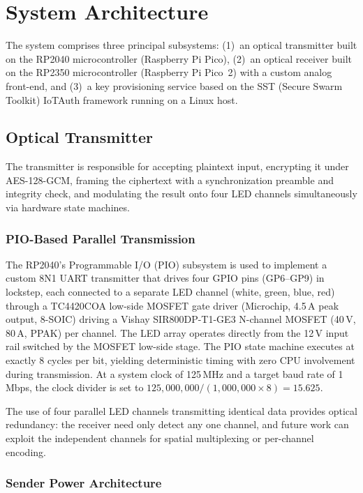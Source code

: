 \documentclass[conference]{IEEEtran}
\begin{document}
\section{System Architecture}

The system comprises three principal subsystems: (1)~an optical transmitter built on the RP2040 microcontroller (Raspberry Pi Pico), (2)~an optical receiver built on the RP2350 microcontroller (Raspberry Pi Pico~2) with a custom analog front-end, and (3)~a key provisioning service based on the SST (Secure Swarm Toolkit) IoTAuth framework running on a Linux host.

\subsection{Optical Transmitter}

The transmitter is responsible for accepting plaintext input, encrypting it under AES-128-GCM, framing the ciphertext with a synchronization preamble and integrity check, and modulating the result onto four LED channels simultaneously via hardware state machines.

\subsubsection{PIO-Based Parallel Transmission}

The RP2040's Programmable I/O (PIO) subsystem is used to implement a custom 8N1 UART transmitter that drives four GPIO pins (GP6--GP9) in lockstep, each connected to a separate LED channel (white, green, blue, red) through a TC4420COA low-side MOSFET gate driver (Microchip, 4.5\,A peak output, 8-SOIC) driving a Vishay SIR800DP-T1-GE3 N-channel MOSFET (40\,V, 80\,A, PPAK) per channel. The LED array operates directly from the 12\,V input rail switched by the MOSFET low-side stage. The PIO state machine executes at exactly 8 cycles per bit, yielding deterministic timing with zero CPU involvement during transmission. At a system clock of 125\,MHz and a target baud rate of 1\,Mbps, the clock divider is set to $125{,}000{,}000 / (1{,}000{,}000 \times 8) = 15.625$.

The use of four parallel LED channels transmitting identical data provides optical redundancy: the receiver need only detect any one channel, and future work can exploit the independent channels for spatial multiplexing or per-channel encoding.

\subsubsection{Sender Power Architecture}
\end{document}
